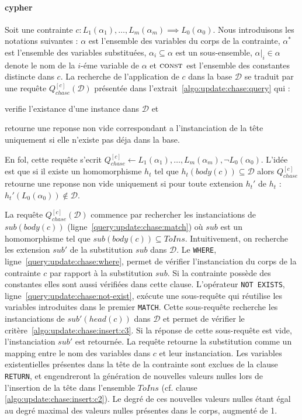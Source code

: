 \paragraph{\gls{cypher}}
Soit une contrainte $c : L_1(\alpha_1), \dots, L_m(\alpha_m) \implies L_0(\alpha_0)$.
Nous introduisons les notations suivantes : $\alpha$ est l'ensemble des variables du corps de la contrainte, $\alpha^*$ est l'ensemble des variables substituées, $\alpha_i \subseteq \alpha$ est un sous-ensemble, $\alpha|_i \in \alpha$ denote le nom de la $i$-éme variable de $\alpha$ et $\textsc{const}$ est l'ensemble des constantes distincte dans $c$.
La recherche de l'application de $c$ dans la base $\mathcal{D}$ se traduit par une requête $Q_{chase}^{[c]}(\mathcal{D})$ présentée dans l'extrait~\ref{algo:update:chase:query} qui :
\begin{enumerate*}[label=(\roman*)]
    \item verifie l'existance d'une instance dans $\mathcal{D}$ et
    \item retourne une reponse non vide correspondant a l'instanciation de la tête uniquement si elle n'existe pas déja dans la base.
\end{enumerate*}
En \gls{fol}, cette requête s'ecrit $Q_{chase}^{[c]} \gets L_1(\alpha_1), \dots, L_m(\alpha_m), \lnot L_0(\alpha_0)$.
L'idée est que si il existe un homomorphisme $h_t$ tel que $h_t(body(c)) \subseteq \mathcal{D}$ alors $Q_{chase}^{[c]}$ retourne une reponse non vide uniquement si pour toute extension $h_t'$ de $h_t$ : $h_t'(L_0(\alpha_0)) \notin \mathcal{D}$.

La requête $Q_{chase}^{[c]}(\mathcal{D})$ commence par rechercher les instanciations de $sub(body(c))$ (ligne~\ref{query:update:chase:match}) où $sub$ est un homomorphisme tel que $sub(body(c)) \subseteq ToIns$.
Intuitivement, on recherche les extension $sub'$ de la substitution $sub$ dans $\mathcal{D}$.
Le \verb|WHERE|, ligne~\ref{query:update:chase:where}, permet de vérifier l'instanciation du corps de la contrainte $c$ par rapport à la substitution $sub$.
Si la contrainte possède des constantes elles sont aussi vérifiées dans cette clause.
L'opérateur \verb|NOT EXISTS|, ligne~\ref{query:update:chase:not-exist}, exécute une sous-requête qui réutilise les variables introduites dans le premier \verb|MATCH|.
Cette sous-requête recherche les instanciations de $sub'(head(c))$ dans $\mathcal{D}$ et permet de vérifier le critère~\ref{algo:update:chase:insert:c3}.
Si la réponse de cette sous-requête est vide, l'instanciation $sub'$ est retournée.
La requête retourne la substitution comme un mapping entre le nom des variables dans $c$ et leur instanciation.
Les variables existentielles présentes dans la tête de la contrainte sont exclues de la clause \verb|RETURN|, et  engendreront la génération de nouvelles valeurs nulles lors de l'insertion de la tête dans l'ensemble $ToIns$ (cf. clause \ref{algo:update:chase:insert:c2}).
Le degré de ces nouvelles valeurs nulles étant égal au degré maximal des valeurs nulles présentes dans le corps, augmenté de 1.

